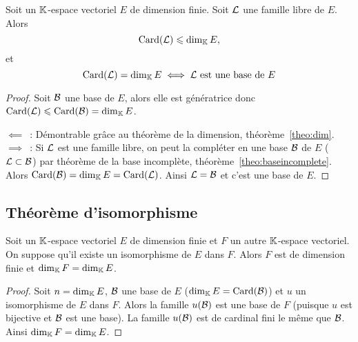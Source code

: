 \begin{theo}
  Soit un \(\mathbb{K}\)-espace vectoriel \(E\) de dimension finie. Soit \(\mathcal{L}\) une
  famille libre de \(E\). Alors
  \begin{equation}
    \operatorname{Card}(\mathcal{L}) \leqslant \operatorname{dim}_{\mathbb{K}} E,
  \end{equation}
  et
  \begin{equation}
    \operatorname{Card}(\mathcal{L})=\operatorname{dim}_{\mathbb{K}} E \iff \mathcal{L} \text{~est une base de } E
  \end{equation}
\end{theo}
\begin{proof}
  Soit \(\mathcal{B}\) une base de \(E\), alors elle est génératrice donc \(\operatorname{Card}(\mathcal{L})
  \leqslant \operatorname{Card}(\mathcal{B})=\operatorname{dim}_{\mathbb{K}} E\).

  \(\impliedby\)~: Démontrable grâce au théorème de la dimension, théorème~\ref{theo:dim}.  \(\implies\)~: Si \(\mathcal{L}\) est une famille libre, on peut la
  compléter en une base \(\mathcal{B}\) de \(E\) (\(\mathcal{L} \subset \mathcal{B}\)) par théorème de la
  base incomplète, théorème~\ref{theo:baseincomplete}. Alors \(\operatorname{Card}(\mathcal{B})=\operatorname{dim}_{\mathbb{K}} E = \operatorname{Card}(\mathcal{L})\). Ainsi
  \(\mathcal{L}=\mathcal{B}\) et c'est une base de \(E\).
\end{proof}

\subsection{Théorème d'isomorphisme}

\begin{prop}
  Soit un \(\mathbb{K}\)-espace vectoriel \(E\) de dimension finie et \(F\) un autre
  \(\mathbb{K}\)-espace vectoriel. On suppose qu'il existe un isomorphisme de \(E\) dans
  \(F\). Alors \(F\) est de dimension finie et \(\operatorname{dim}_{\mathbb{K}} F = \operatorname{dim}_{\mathbb{K}} E\).
\end{prop}
\begin{proof}
  Soit \(n = \operatorname{dim}_{\mathbb{K}} E\), \(\mathcal{B}\) une base de \(E\) (\(\operatorname{dim}_{\mathbb{K}} E = \operatorname{Card}(\mathcal{B})\))
  et \(u\) un isomorphisme de \(E\) dans \(F\). Alors la famille \(u(\mathcal{B})\) est
  une base de \(F\) (puisque \(u\) est bijective et \(\mathcal{B}\) est une base). La
  famille \(u(\mathcal{B})\) est de cardinal fini le même que \(\mathcal{B}\). Ainsi \(\operatorname{dim}_{\mathbb{K}} F =
  \operatorname{dim}_{\mathbb{K}} E\).
\end{proof}

